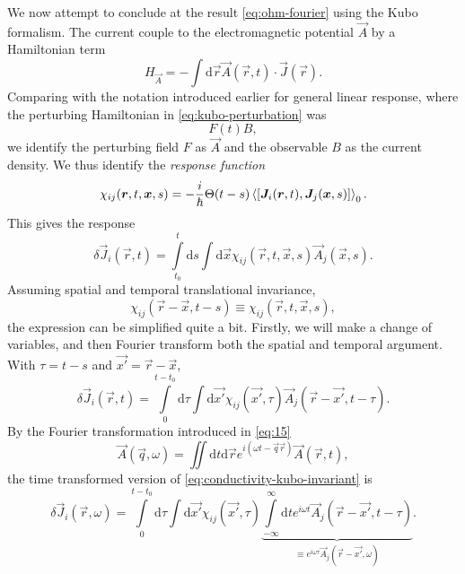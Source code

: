 We now attempt to conclude at the result \eqref{eq:ohm-fourier} using the Kubo formalism.
The current couple to the electromagnetic potential $\vec{A}$ by a Hamiltonian term
\begin{equation}
  \label{eq:electromagnetic-coupling}
  H_{\vec{A}} = -\int \mathrm{d}\vec{r}
   \vec{A}(\vec{r}, t) \cdot \vec{J}(\vec{r}).
\end{equation}
Comparing with the notation introduced earlier for general linear response, where the perturbing Hamiltonian in \cref{eq:kubo-perturbation} was
\[
F(t) {B},
\]
we identify the perturbing field $F$ as $\vec{A}$ and the observable ${B}$ as the current density.
We thus identify the \emph{response function}
\begin{equation}
  \chi_{ij}(\vec{r}, t, \vec{x}, s) = - \frac{i}{\hbar}
  \Theta(t-s)
  \Braket{
    \left[
      \vec{J}_{i}(\vec{r}, t), \vec{J}_{j}(\vec{x}, s)
    \right]
  }_{0}.
\end{equation}
This gives the response
\begin{equation}
  \label{eq:conductivity-kubo}
  \delta  \vec{J}_{i}(\vec{r}, t) =
  \int\limits_{t_0}^{t} \! \mathrm{d}s
  \int \mathrm{d}\vec{x}
  \chi_{ij}(\vec{r}, t, \vec{x}, s)
  \vec{A}_{j}(\vec{x}, s).
\end{equation}
Assuming spatial and temporal translational invariance,
\begin{equation}
  \label{eq:response_trans_invariant}
  \chi_{ij}(\vec{r}-\vec{x}, t-s) \equiv \chi_{ij}(\vec{r}, t, \vec{x}, s),
\end{equation}
the expression can be simplified quite a bit.
Firstly, we will make a change of variables, and then Fourier transform both the spatial and temporal argument.
With $\tau = t-s$ and $\vec{x'} = \vec{r} - \vec{x}$,
\begin{equation}
  \label{eq:conductivity-kubo-invariant}
  \delta \vec{J}_i(\vec{r}, t) =
  \int\limits_0^{t-t_0} \mathrm{d}\tau
  \int \mathrm{d}\vec{x'}
  \chi_{ij}(\vec{x'}, \tau)
  \vec{A}_{j}(\vec{r} - \vec{x'}, t-\tau).
\end{equation}
By the Fourier transformation introduced in \cref{eq:15}
\[
  \vec{A}(\vec{q}, \omega ) =
  \iint \mathrm{d}t \mathrm{d} \vec{r}
  e^{i(\omega  t - \vec{q} \vec{r} )}
  \vec{A}(\vec{r}, t),
\]
the time transformed version of \cref{eq:conductivity-kubo-invariant} is 
\begin{equation}
  \delta \vec{J}_{i}(\vec{r}, \omega) =
  \int\limits_0^{t-t_0} \! \mathrm{d}\tau
  \int \mathrm{d}\vec{x'}
  \chi_{ij}(\vec{x'}, \tau)
  \underbrace{
    \int\limits_{-\infty}^{\infty} \mathrm{d}t
    e^{i \omega t}
    \vec{A}_{j}(\vec{r} - \vec{x'}, t-\tau)
    }_{\equiv e^{i\omega \tau} \vec{A}_{j}(\vec{r} - \vec{x'}, \omega)}.
\end{equation}
